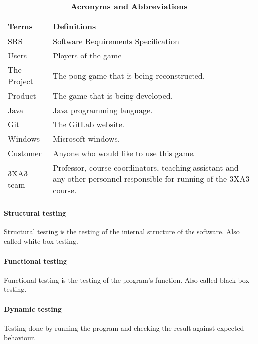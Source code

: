 \documentclass[12pt,letterpaper]{article}
\begin{document}
\begin{table}[h]
\caption{\bf Acronyms and Abbreviations}
\begin{tabularx}{\textwidth}{| X | X |}
\hline
\textbf{Terms}    & \textbf{Definitions}                                                                                                                                                                                                                                                                                                                                                                                                                                \\\hline
SRS & Software Requirements Specification
\\\hline
Users &                                                                                                                                                                                            Players of the game \\\hline
The Project  & The pong game that is being reconstructed. \\\hline
Product       & The game that is being developed.
 \\\hline
Java            & Java programming language.
 \\\hline
Git        & The GitLab website.
 \\\hline
Windows       & Microsoft windows.
 \\\hline
Customer         & Anyone who would like to use this game.
 \\\hline
3XA3 team        & Professor, course coordinators, teaching assistant and any other personnel responsible for running of the 3XA3 course.
 \\\hline
\end{tabularx}
\end{table}

	\paragraph{Structural testing}	Structural testing is the testing of the internal structure of the software. Also called white box testing.
	\paragraph{Functional testing}	Functional testing is the testing of the program’s function. Also called black box testing.
	\paragraph{Dynamic testing}	Testing done by running the program and checking the result against expected behaviour.
\end{document}

